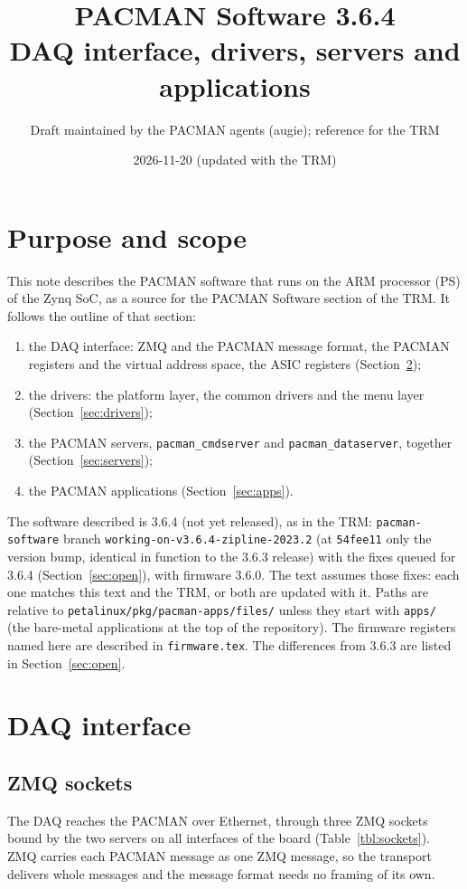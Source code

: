 \documentclass[12pt]{article}
\title{PACMAN Software 3.6.4\\[2pt]
  \large DAQ interface, drivers, servers and applications}
\author{Draft maintained by the PACMAN agents (augie); reference for the TRM}
\date{2026-11-20 (updated with the TRM)}
\newcommand{\f}[1]{\texttt{#1}}
\begin{document}
\maketitle
\sloppy

\section{Purpose and scope}

This note describes the PACMAN software that runs on the ARM processor (PS) of the Zynq SoC, as a
source for the PACMAN Software section of the TRM.  It follows the outline of that section:
\begin{enumerate}
\item the DAQ interface:  ZMQ and the PACMAN message format, the PACMAN registers and the virtual
  address space, the ASIC registers (Section~\ref{sec:daq});
\item the drivers:  the platform layer, the common drivers and the menu layer
  (Section~\ref{sec:drivers});
\item the PACMAN servers, \f{pacman\_cmdserver} and \f{pacman\_dataserver}, together
  (Section~\ref{sec:servers});
\item the PACMAN applications (Section~\ref{sec:apps}).
\end{enumerate}
The software described is 3.6.4 (not yet released), as in the TRM:  \f{pacman-software} branch
\f{working-on-v3.6.4-zipline-2023.2} (at \f{54fee11} only the version bump, identical in function to
the 3.6.3 release) with the fixes queued for 3.6.4 (Section~\ref{sec:open}), with firmware 3.6.0.  The text
assumes those fixes:  each one matches this text and the TRM, or both are updated with it.
Paths are relative to \f{petalinux/pkg/pacman-apps/files/} unless they start with \f{apps/} (the
bare-metal applications at the top of the repository).  The firmware registers named here are
described in \f{firmware.tex}.  The differences from 3.6.3 are listed in Section~\ref{sec:open}.

\section{DAQ interface}\label{sec:daq}

\subsection{ZMQ sockets}\label{sec:zmq}

The DAQ reaches the PACMAN over Ethernet, through three ZMQ sockets bound by the two servers on all
interfaces of the board (Table~\ref{tbl:sockets}).  ZMQ carries each PACMAN message as one ZMQ
message, so the transport delivers whole messages and the message format needs no framing of its
own.
\end{document}

